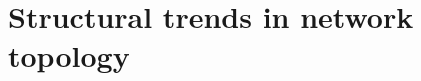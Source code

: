 \documentclass[phd,tocprelim]{cornell}
\renewcommand{\caption}[1]{\singlespacing\hangcaption{#1}\normalspacing}
\begin{document}

\section{Structural trends in network topology}
\label{sec:global}
\end{document}
